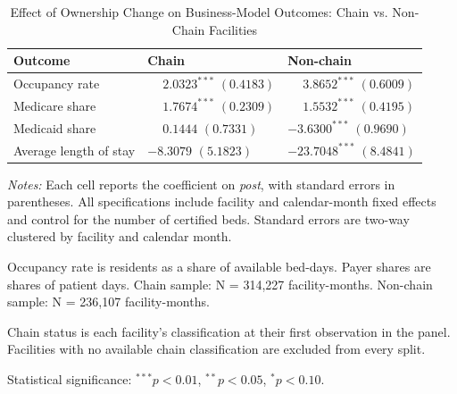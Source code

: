 \begin{table}[!ht]
\centering
\begin{threeparttable}
\caption{Effect of Ownership Change on Business-Model Outcomes: Chain vs. Non-Chain Facilities}
\label{tab:het-chain-business}
\small
\setlength{\tabcolsep}{6pt}

\begin{tabularx}{\textwidth}{@{} l Y Y @{}}
\toprule
Outcome & Chain & Non-chain \\
\midrule
Occupancy rate &  &  \\
Medicare share &  &  \\
Medicaid share &  &  \\
Average length of stay &  &  \\
\bottomrule
\end{tabularx}

\begin{tablenotes}[flushleft]
\footnotesize
\item \textit{Notes:} Each cell reports the coefficient on \textit{post}, with standard errors in parentheses. All specifications include facility and calendar-month fixed effects and control for the number of certified beds. Standard errors are two-way clustered by facility and calendar month.
\item Occupancy rate is residents as a share of available bed-days. Payer shares are shares of patient days. Chain sample: N = 314,227 facility-months. Non-chain sample: N = 236,107 facility-months.
\item Chain status is each facility's classification at their first observation in the panel. Facilities with no available chain classification are excluded from every split.
\item Statistical significance: $^{***}p<0.01$, $^{**}p<0.05$, $^{*}p<0.10$.
\end{tablenotes}

\end{threeparttable}
\end{table}

